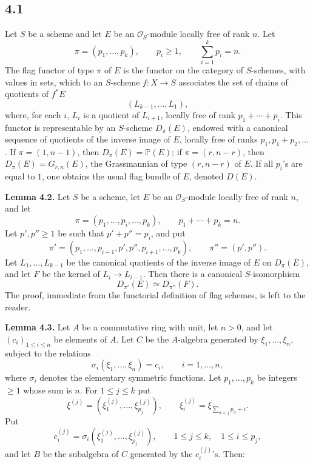 \subsection*{4.1}
Let \(S\) be a scheme and let \(E\) be an \(\mathcal O_S\)-module locally free of rank \(n\). Let
\[
  \pi=(p_1,\ldots,p_k),\qquad p_i\geq 1,
  \qquad \sum_{i=1}^k p_i=n.
\]
The flag functor of type \(\pi\) of \(E\) is the functor on the category of \(S\)-schemes, with values in sets, which to an \(S\)-scheme \(f:X\to S\) associates the set of chains of quotients of \(f^*E\)
\[
  (L_{k-1},\ldots,L_1),
\]
where, for each \(i\), \(L_i\) is a quotient of \(L_{i+1}\), locally free of rank \(p_1+\cdots+p_i\). This functor is representable by an \(S\)-scheme \(D_\pi(E)\), endowed with a canonical sequence of quotients of the inverse image of \(E\), locally free of ranks \(p_1,p_1+p_2,\ldots\). If \(\pi=(1,n-1)\), then \(D_\pi(E)=\mathbb P(E)\); if \(\pi=(r,n-r)\), then \(D_\pi(E)=G_{r,n}(E)\), the Grassmannian of type \((r,n-r)\) of \(E\). If all \(p_i\)'s are equal to \(1\), one obtains the usual flag bundle of \(E\), denoted \(D(E)\).

\textbf{Lemma 4.2.} Let \(S\) be a scheme, let \(E\) be an \(\mathcal O_S\)-module locally free of rank \(n\), and let
\[
  \pi=(p_1,\ldots,p_i,\ldots,p_k),\qquad p_1+\cdots+p_k=n.
\]
Let \(p',p''\geq 1\) be such that \(p'+p''=p_i\), and put
\[
  \pi'=(p_1,\ldots,p_{i-1},p',p'',p_{i+1},\ldots,p_k),
  \qquad \pi''=(p',p'').
\]
Let \(L_1,\ldots,L_{k-1}\) be the canonical quotients of the inverse image of \(E\) on \(D_\pi(E)\), and let \(F\) be the kernel of \(L_i\to L_{i-1}\). Then there is a canonical \(S\)-isomorphism
\[
  D_{\pi'}(E)\simeq D_{\pi''}(F).
\]
The proof, immediate from the functorial definition of flag schemes, is left to the reader.

\textbf{Lemma 4.3.} Let \(A\) be a commutative ring with unit, let \(n>0\), and let \((c_i)_{1\leq i\leq n}\) be elements of \(A\). Let \(C\) be the \(A\)-algebra generated by \(\xi_1,\ldots,\xi_n\), subject to the relations
\[
  \sigma_i(\xi_1,\ldots,\xi_n)=c_i,
  \qquad i=1,\ldots,n,
\]
where \(\sigma_i\) denotes the elementary symmetric functions. Let \(p_1,\ldots,p_k\) be integers \(\geq 1\) whose sum is \(n\). For \(1\leq j\leq k\) put
\[
  \xi^{(j)}=(\xi^{(j)}_1,\ldots,\xi^{(j)}_{p_j}),
  \qquad
  \xi_i^{(j)}=\xi_{\sum_{\alpha<j}p_\alpha+i}.
\]
Put
\[
  c_i^{(j)}=\sigma_i(\xi^{(j)}_1,\ldots,\xi^{(j)}_{p_j}),
  \qquad 1\leq j\leq k,
  \quad 1\leq i\leq p_j,
\]
and let \(B\) be the subalgebra of \(C\) generated by the \(c_i^{(j)}\)'s. Then:

